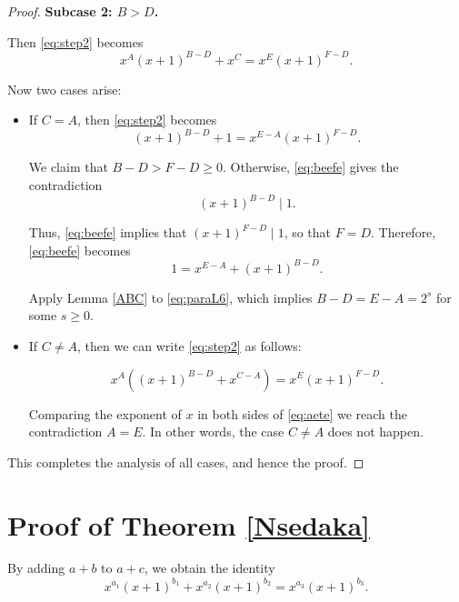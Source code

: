 \documentclass[12pt, reqno]{article}
\theoremstyle{plain}
\theoremstyle{definition}
\theoremstyle{remark}
\begin{document}
\begin{proof}
\textbf{Subcase 2: \( B > D \).}

Then \eqref{eq:step2} becomes
\[
x^A(x+1)^{B - D} + x^C = x^{E}(x+1)^{F - D}.
\]

 Now two cases arise:

\begin{itemize}
    \item If \( C = A \), then \eqref{eq:step2} becomes
    \begin{equation}
    \label{eq:beefe}
    (x+1)^{B - D} + 1 = x^{E - A}(x+1)^{F - D}.
    \end{equation}
    
    We claim that $B - D > F -D \geq 0$. Otherwise, \eqref{eq:beefe} gives the contradiction
  \[
    (x+1)^{B - D} \mid 1.
    \]
    
    Thus, \eqref{eq:beefe} implies that $(x+1)^{F - D} \mid 1$, so that $F = D$.
    Therefore,  \eqref{eq:beefe} becomes
    \begin{equation}
    \label{eq:paraL6}
     1 = x^{E - A} + (x+1)^{B - D}.
    \end{equation}
    
     
       
   Apply Lemma \ref{ABC} to  \eqref{eq:paraL6}, which implies  \( B - D = E - A = 2^s \) for some \( s \geq 0 \).
   

   \item If \( C \neq A \), then we can write \eqref{eq:step2} as follows:
   
   \begin{equation}
    \label{eq:aete}
     x^A \left( (x+1)^{B-D} + x ^{C-A} \right) = x^{E} (x+1)^{F - D}.
    \end{equation}
    
   Comparing the exponent of $x$ in both sides of \eqref{eq:aete} we reach the contradiction $A = E$. In other words, the case $C \neq A$ does not happen.
 
\end{itemize}
This completes the analysis of all cases, and hence the proof.
\end{proof}



\section{Proof of Theorem \ref{Nsedaka}}
\label{dos}

By adding $a + b$ to $a + c$, we obtain the identity
\begin{equation}
\label{dos1}
x^{a_1}(x+1)^{b_1} + x^{a_2}(x+1)^{b_2} = x^{a_3}(x+1)^{b_3}.
\end{equation}
\end{document}
